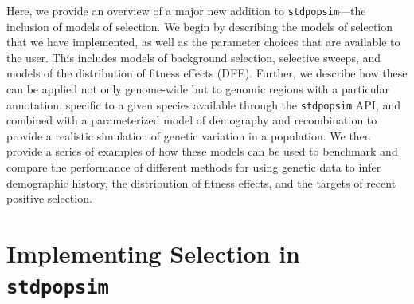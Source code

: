 \documentclass[hidelinks]{article}
\newcommand{\stdpopsim}{\texttt{stdpopsim}\xspace}
\begin{document}
    Here, we provide an overview of a major new addition
    to \stdpopsim---the inclusion of models of selection.
    We begin by describing the models of selection that we have implemented,
    as well as the parameter choices that are available to the user.
    This includes models of background selection, selective sweeps, and
    models of the distribution of fitness effects (DFE).
    Further, we describe how these can be applied not only genome-wide but to
    genomic regions with a particular annotation, specific to a given species available
    through the \stdpopsim API, and combined with a parameterized model of
    demography and recombination to provide a realistic simulation of
    genetic variation in a population.
    We then provide a series of examples of how these models can be used
    to benchmark and compare the performance of different methods for
    using genetic data to infer demographic history, the distribution of fitness effects,
    and the targets of recent positive selection.

\section*{Implementing Selection in \stdpopsim}
    \label{selection}
\end{document}
